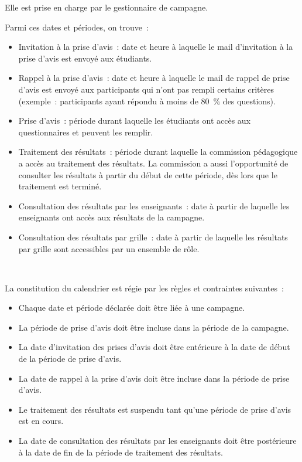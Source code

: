 \documentclass[a4paper,11pt]{report}
\begin{document}
\noindent Elle est prise en charge par le gestionnaire de campagne.

\noindent Parmi ces dates et périodes, on trouve~:
\begin{itemize}
	\item Invitation à la prise d'avis~: date et heure à laquelle le mail d'invitation à la prise d'avis est envoyé aux étudiants.
	\item Rappel à la prise d'avis~: date et heure à laquelle le mail de rappel de prise d'avis est envoyé aux participants qui n'ont pas rempli certains critères (exemple~: participants ayant répondu à moins de 80~\% des questions).
	\item Prise d'avis~: période durant laquelle les étudiants ont accès aux questionnaires et peuvent les remplir.
	\item Traitement des résultats~: période durant laquelle la commission pédagogique a accès au traitement des résultats. La commission a aussi l'opportunité de consulter les résultats à partir du début de cette période, dès lors que le traitement est terminé.
	\item Consultation des résultats par les enseignants~: date à partir de laquelle les enseignants ont accès aux résultats de la campagne.
	\item Consultation des résultats par grille~: date à partir de laquelle les résultats par grille sont accessibles par un ensemble de rôle.
\end{itemize}
~\newline{}

La constitution du calendrier est régie par les règles et contraintes suivantes~:
\begin{itemize}
	\item Chaque date et période déclarée doit être liée à une campagne.
	\item La période de prise d'avis doit être incluse dans la période de la campagne.
	\item La date d'invitation des prises d'avis doit être entérieure à la date de début de la période de prise d'avis.
	\item La date de rappel à la prise d'avis doit être incluse dans la période de prise d'avis.
	\item Le traitement des résultats est suspendu tant qu'une période de prise d'avis est en cours.
	\item La date de consultation des résultats par les enseignants doit être postérieure à la date de fin de la période de traitement des résultats.
\end{itemize}
\end{document}
